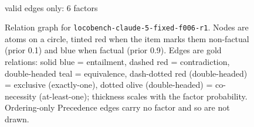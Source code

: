 \documentclass[11pt]{article}
\begin{document}
\begin{figure}[htbp]
\begin{minipage}[t]{0.48\linewidth}
{
}
\\[2pt]{\footnotesize valid edges only: 6 factors}
\end{minipage}
\caption{Relation graph for \texttt{locobench-claude-5-fixed-f006-r1}. Nodes are atoms on a circle, tinted red when the item marks them non-factual (prior 0.1) and blue when factual (prior 0.9). Edges are gold relations: solid blue = entailment, dashed red = contradiction, double-headed teal = equivalence, dash-dotted red (double-headed) = exclusive (exactly-one), dotted olive (double-headed) = co-necessity (at-least-one); thickness scales with the factor probability. Ordering-only Precedence edges carry no factor and so are not drawn.}
\label{fig:graph-locobench-claude-5-fixed-f006-r1}
\end{figure}
\end{document}
